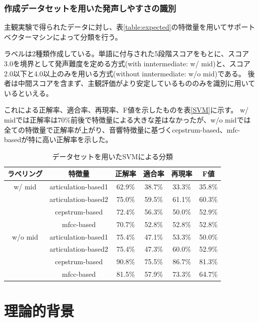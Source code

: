 \documentclass[10.5ptj,a4j,dvipdfmx,uplatex, oneside, openany, report, draft]{jsbook}%
\begin{document}
\subsection{作成データセットを用いた発声しやすさの識別}
主観実験で得られたデータに対し、表\ref{table:expected}の特徴量を用いてサポートベクターマシンによって分類を行う。

ラベルは2種類作成している。単語に付与された5段階スコアをもとに、スコア3.0を境界として発声難度を定める方式(with inntermediate: w/ mid)と、スコア2.0以下と4.0以上のみを用いる方式(without inntermediate: w/o mid)である。
後者は中間スコアを含まず、主観評価がより安定しているもののみを識別に用いているといえる。

これによる正解率、適合率、再現率、F値を示したものを表\ref{SVM}に示す。
w/ midでは正解率は70\%前後で特徴量による大きな差はなかったが、w/o midでは全ての特徴量で正解率が上がり、音響特徴量に基づくcepstrum-based、mfc-basedが特に高い正解率を示した。

\begin{table}[h]
    \small
    \caption{データセットを用いたSVMによる分類}
    \label{table:SVM}
    \centering
\begin{tabular}{cccccc}
    \hline
    ラベリング & 特徴量 & 正解率 & 適合率 & 再現率 & F値\\
    \hline \hline
    w/ mid & articulation-based1 & 62.9\% & 38.7\% & 33.3\% & 35.8\%\\
    & articulation-based2 & 75.0\% & 59.5\% & 61.1\% & 60.3\%\\
    & cepstrum-based & 72.4\% & 56.3\% & 50.0\% & 52.9\%\\
    & mfcc-based & 70.7\% & 52.8\% & 52.8\% & 52.8\%\\
    \hline
    w/o mid & articulation-based1 & 75.4\% & 47.1\% & 53.3\% & 50.0\%\\
    & articulation-based2 & 75.4\% & 47.3\% & 60.0\% & 52.9\%\\
    & cepstrum-based & 90.8\% & 75.5\% & 86.7\% & 81.3\%\\
    & mfcc-based & 81.5\% & 57.9\% & 73.3\% & 64.7\%\\
    \hline

\end{tabular}
\end{table}




\chapter{理論的背景}
\end{document}
